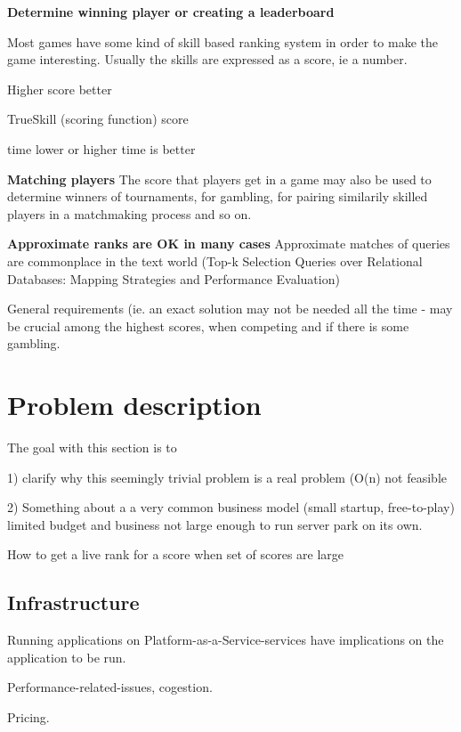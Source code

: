 \textbf{Determine winning player or creating a leaderboard}

Most games have some kind of skill based ranking system in order to make the game interesting. Usually the skills are expressed as a score, ie a number.

Higher score \ra better

TrueSkill (scoring function) \ra score

time \ra lower or higher time is better

\textbf{Matching players}
The score that players get in a game may also be used to determine winners of tournaments, for gambling, for pairing similarily skilled players in a matchmaking process and so on.

\textbf{Approximate ranks are OK in many cases} Approximate matches of queries are commonplace in the text world (Top-k Selection Queries over Relational
Databases: Mapping Strategies and
Performance Evaluation)

General requirements (ie. an exact solution may not be needed all the time - may be crucial among the highest scores, when competing and if there is some gambling.
  
\section{Problem description}

\begin{shaded}The goal with this section is to

  1) clarify why this seemingly trivial problem is a real problem (O(n) \ra not feasible

  2) Something about a a very common business model (small startup, free-to-play) limited budget and business not large enough to run server park on its own. \end{shaded}

How to get a live rank for a score when set of scores are large

\subsection{Infrastructure}

\begin{shaded}
  Running applications on Platform-as-a-Service-services have implications on the application to be run.

  Performance-related-issues, cogestion.

  Pricing.

  \end{shaded}

